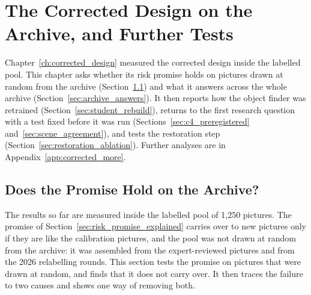 \chapter{The Corrected Design on the Archive, and Further Tests}
\label{ch:corrected_tests}

Chapter~\ref{ch:corrected_design} measured the corrected design inside the labelled pool. This chapter asks whether its risk promise holds on pictures drawn at random from the archive (Section~\ref{sec:archive_check}) and what it answers across the whole archive (Section~\ref{sec:archive_answers}). It then reports how the object finder was retrained (Section~\ref{sec:student_rebuild}), returns to the first research question with a test fixed before it was run (Sections~\ref{sec:c4_preregistered} and~\ref{sec:scene_agreement}), and tests the restoration step (Section~\ref{sec:restoration_ablation}). Further analyses are in Appendix~\ref{app:corrected_more}.

\section{Does the Promise Hold on the Archive?}
\label{sec:archive_check}

The results so far are measured inside the labelled pool of 1,250 pictures. The promise of Section~\ref{sec:risk_promise_explained} carries over to new pictures only if they are like the calibration pictures, and the pool was not drawn at random from the archive: it was assembled from the expert-reviewed pictures and from the 2026 relabelling rounds. This section tests the promise on pictures that were drawn at random, and finds that it does not carry over. It then traces the failure to two causes and shows one way of removing both.


